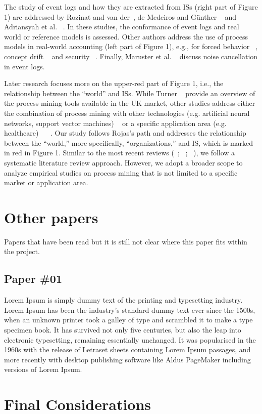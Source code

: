 The study of event logs and how they are extracted from ISs (right part of Figure 1) are addressed by Rozinat and van der~\cite{rozinat2006decision}, de Medeiros and Günther ~\cite{de2005process} and Adriansyah et al. ~\cite{adriansyah2011conformance}. In these studies, the conformance of event logs and real world or reference models is assessed. Other authors address the use of process models in real-world accounting (left part of Figure 1), e.g., for forced behavior ~\cite{wen2009novel}, concept drift ~\cite{engel2014case} and security ~\cite{van2005process}. Finally, Maruster et al. ~\cite{muarucster2006rule} discuss noise cancellation in event logs.

Later research focuses more on the upper-red part of Figure 1, i.e., the relationship between the “world” and ISs. While Turner ~\cite{turner2012process} provide an overview of the process mining tools available in the UK market, other studies address either the combination of process mining with other technologies (e.g. artificial neural networks, support vector machines) ~\cite{maita2015ultraflexible} or a specific application area (e.g. healthcare) ~\cite{rojas2016process} ~\cite{yang2014process}. Our study follows Rojas’s path and addresses the relationship between the “world,” more specifically, “organizations,” and IS, which is marked in red in Figure 1. Similar to the most recent reviews (~\cite{kurniati2016process}; ~\cite{maita2015process}; ~\cite{rojas2016process}), we follow a systematic literature review approach. However, we adopt a broader scope to analyze empirical studies on process mining that is not limited to a specific market or application area.



\section{Other papers}

Papers that have been read but it is still not clear where this paper fits within the project.

\subsection{Paper \#01}

Lorem Ipsum is simply dummy text of the printing and typesetting industry. Lorem Ipsum has been the industry's standard dummy text ever since the 1500s, when an unknown printer took a galley of type and scrambled it to make a type specimen book. It has survived not only five centuries, but also the leap into electronic typesetting, remaining essentially unchanged. It was popularised in the 1960s with the release of Letraset sheets containing Lorem Ipsum passages, and more recently with desktop publishing software like Aldus PageMaker including versions of Lorem Ipsum.

\section{Final Considerations}
